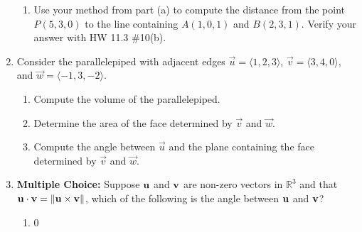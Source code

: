 \documentclass[12pt]{article}
\newif\ifans
\begin{document}
\begin{enumerate}
\begin{enumerate}
\item Use your method from part (a) to compute the distance from the point $P(5,3,0)$ to the line containing $A(1,0,1)$ and $B(2,3,1)$.  Verify your answer with HW 11.3 \#10(b).

\ifans{\fbox{$d=\sqrt{\frac{91}{10}}$}} \fi

\end{enumerate}

\item Consider the parallelepiped with adjacent edges $\overrightarrow{u}=\langle1,2,3\rangle$, $\overrightarrow{v}=\langle3,4,0\rangle$, and $\overrightarrow{w}=\langle-1,3,-2\rangle$.

\begin{enumerate}

\item Compute the volume of the parallelepiped.

\ifans{\fbox{43; Detailed Solution: \textcolor{blue}{\href{http://www.math.drexel.edu/classes/Calculus/resources/Math200HW/Solutions/04_200_Cross_Product_07.pdf}{Here}}}} \fi

\item Determine the area of the face determined by $\overrightarrow{v}$ and $\overrightarrow{w}$.

\ifans{\fbox{$\sqrt{269}$; Detailed Solution: \textcolor{blue}{\href{http://www.math.drexel.edu/classes/Calculus/resources/Math200HW/Solutions/04_200_Cross_Product_07.pdf}{Here}}}} \fi

\item Compute the angle between $\overrightarrow{u}$ and the plane containing the face determined by $\overrightarrow{v}$ and $\overrightarrow{w}$.

\ifans{\fbox{$\frac{\pi}{2}-\cos^{-1}\left(\frac{43}{\sqrt{14}\sqrt{269}}\right)$; Detailed Solution: \textcolor{blue}{\href{http://www.math.drexel.edu/classes/Calculus/resources/Math200HW/Solutions/04_200_Cross_Product_07.pdf}{Here}}}} \fi

\end{enumerate}

\item {\bf Multiple Choice:} Suppose ${\bf u}$ and ${\bf v}$ are non-zero vectors in $\mathbb{R}^3$ and that ${\bf u}\cdot{\bf v}=\|{\bf u}\times{\bf v}\|$, which of the following is the angle between ${\bf u}$ and ${\bf v}$?

\begin{enumerate}

\item 0


\end{enumerate}
\end{enumerate}
\end{document}

